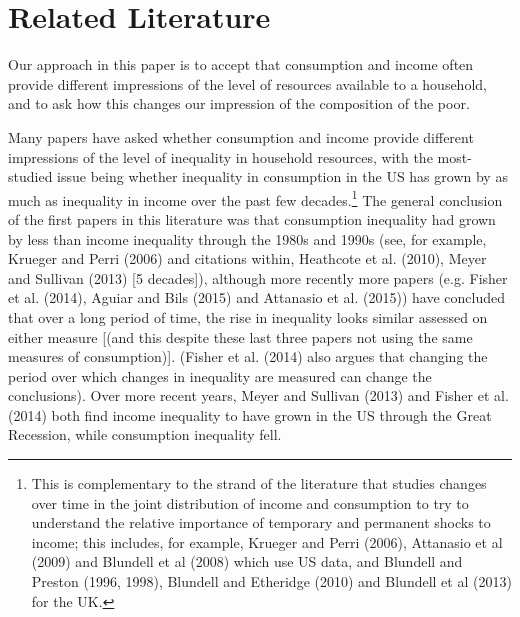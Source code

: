 \section{Related Literature}\label{sec:literature}


Our approach in this paper is to accept that consumption and income often provide different impressions of the level of resources available to a household, and to ask how this changes our impression of the composition of the poor. 

Many papers have asked whether consumption and income provide different impressions of the level of inequality in household resources, with the most-studied issue being whether inequality in consumption in the US has grown by as much as inequality in income over the past few decades.\footnote{This is complementary to the strand of the literature that studies changes over time in the joint distribution of income and consumption to try to understand the relative importance of temporary and permanent shocks to income; this includes, for example, Krueger and Perri (2006), Attanasio et al (2009) and Blundell et al (2008) which use US data, and Blundell and Preston (1996, 1998), Blundell and Etheridge (2010) and Blundell et al (2013) for the UK.}  The general conclusion of the first papers in this literature was that consumption inequality had grown by less than income inequality through the 1980s and 1990s (see, for example, Krueger and Perri (2006) and citations within, Heathcote et al. (2010), Meyer and Sullivan (2013) [5 decades]), although more recently more papers (e.g. Fisher et al. (2014), Aguiar and Bils (2015) and Attanasio et al. (2015)) have concluded that over a long period of time, the rise in inequality looks similar assessed on either measure [(and this despite these last three papers not using the same measures of consumption)]. (Fisher et al. (2014) also argues that changing the period over which changes in inequality are measured can change the conclusions). Over more recent years, Meyer and Sullivan (2013) and Fisher et al. (2014) both find income inequality to have grown in the US through the Great Recession, while consumption inequality fell. 

